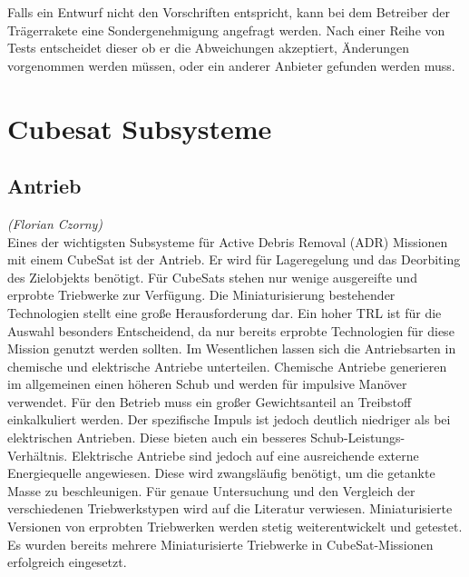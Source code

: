 		Falls ein Entwurf nicht den Vorschriften entspricht, kann bei dem Betreiber der Trägerrakete eine Sondergenehmigung angefragt werden. Nach einer Reihe von Tests entscheidet dieser ob er die Abweichungen akzeptiert, Änderungen vorgenommen werden müssen, oder ein anderer Anbieter gefunden werden muss. \cite{CaliforniaPolytechnicStateUniversity.2014} 

	\section{Cubesat Subsysteme}%
		\subsection{Antrieb}
\hfill\emph{(Florian Czorny)}\\
Eines der wichtigsten Subsysteme für Active Debris Removal (ADR) Missionen mit einem CubeSat ist der Antrieb. Er wird für Lageregelung und das Deorbiting des Zielobjekts benötigt.
Für CubeSats stehen nur wenige ausgereifte und erprobte Triebwerke zur Verfügung.  Die Miniaturisierung bestehender Technologien stellt eine große Herausforderung dar. Ein hoher TRL ist für die Auswahl besonders Entscheidend, da nur bereits erprobte Technologien für diese Mission genutzt werden sollten.
Im Wesentlichen lassen sich die Antriebsarten in chemische und elektrische Antriebe unterteilen.  Chemische Antriebe generieren im allgemeinen einen höheren Schub und werden für impulsive Manöver verwendet. Für den Betrieb muss ein großer Gewichtsanteil an Treibstoff einkalkuliert werden. Der spezifische Impuls ist jedoch deutlich niedriger als bei elektrischen Antrieben. Diese bieten auch ein besseres Schub-Leistungs-Verhältnis. Elektrische Antriebe sind jedoch auf eine ausreichende externe Energiequelle angewiesen. Diese wird zwangsläufig benötigt, um die getankte Masse zu beschleunigen.
Für genaue Untersuchung und den Vergleich der verschiedenen Triebwerkstypen wird auf die Literatur \cite{Lettau.} verwiesen. Miniaturisierte Versionen von erprobten Triebwerken werden stetig weiterentwickelt und getestet. Es wurden bereits mehrere Miniaturisierte Triebwerke in CubeSat-Missionen erfolgreich eingesetzt. 

